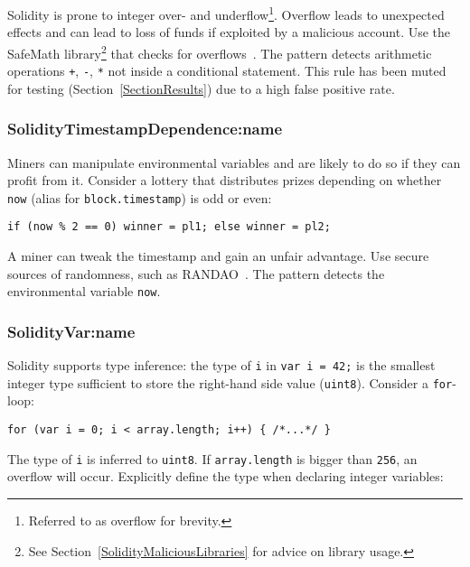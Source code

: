 Solidity is prone to integer over- and underflow\footnote{Referred to as overflow for brevity.}.
Overflow leads to unexpected effects and can lead to loss of funds if exploited by a malicious account.
Use the SafeMath library\footnote{See Section~\ref{SolidityMaliciousLibraries} for advice on library usage.} that checks for overflows~\cite{OpenZeppelin2017}.
The pattern detects arithmetic operations \texttt{+}, \texttt{-}, \texttt{*} not inside a conditional statement.
This rule has been muted for testing (Section~\ref{SectionResults}) due to a high false positive rate.


\subsubsection{\let\letcs\texapiletcs \usevalue SolidityTimestampDependence:name \let\letcs\etoolboxletcs} \label{SolidityTimestampDependence}

Miners can manipulate environmental variables and are likely to do so if they can profit from it.
Consider a lottery that distributes prizes depending on whether \texttt{now} (alias for \texttt{block.timestamp}) is odd or even:

\begin{lstlisting}[language=Solidity]
	if (now % 2 == 0) winner = pl1; else winner = pl2;
\end{lstlisting}

A miner can tweak the timestamp and gain an unfair advantage.
Use secure sources of randomness, such as RANDAO~\cite{RANDAO2017}.
The pattern detects the environmental variable \texttt{now}.

\subsubsection{\let\letcs\texapiletcs \usevalue SolidityVar:name \let\letcs\etoolboxletcs} \label{SolidityVar}

Solidity supports type inference: the type of \texttt{i} in \texttt{var i = 42;} is the smallest integer type sufficient to store the right-hand side value (\texttt{uint8}).
Consider a \texttt{for}-loop:

\begin{lstlisting}[language=Solidity]
for (var i = 0; i < array.length; i++) { /*...*/ }
\end{lstlisting}

The type of \texttt{i} is inferred to \texttt{uint8}.
If \texttt{array.length} is bigger than \texttt{256}, an overflow will occur.
Explicitly define the type when declaring integer variables:

